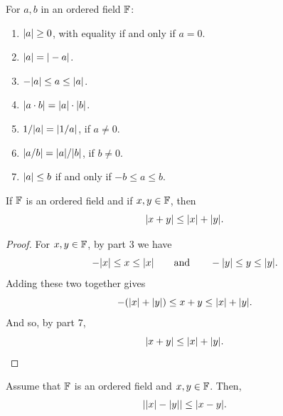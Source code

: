 \documentclass[11pt,twoside=off,numbers=noenddot]{scrbook}
\begin{document}
\begin{fact}
    For $a, b$ in an ordered field $\mathbb F$:
    \begin{enumerate}
        \item $| a | \geq 0$, with equality if and only if $a = 0$.
        \item $| a | = | -a |$.
        \item $-| a | \leq a \leq | a |$.
        \item $| a \cdot b | = | a | \cdot | b |$.
        \item $1/| a | = | 1/a |$, if $a \neq 0$.
        \item $| a/b | = | a |/| b |$, if $b \neq 0$.
        \item $| a | \leq b$ if and only if $-b \leq a \leq b$.
    \end{enumerate}
\end{fact}

\begin{theorem}
    If $\mathbb F$ is an ordered field and if $x, y \in \mathbb F$, then
    \[ | x + y | \leq | x | + | y |. \]
\end{theorem}

\begin{proof}
    For $x, y \in \mathbb F$, by  part 3 we have
    \[ -| x | \leq x \leq | x | \qquad \text{and} \qquad -| y | \leq y \leq | y |. \]
    Adding these two together gives
    \[ -(| x | + | y |) \leq x + y \leq | x | + | y |. \]
    And so, by  part 7,
    \[ | x + y | \leq | x | + | y |. \]
\end{proof}

\begin{corollary}
    Assume that $\mathbb F$ is an ordered field and $x, y \in \mathbb F$. Then,
    \begin{align*}
        | | x | - | y | | \leq | x - y |.
    \end{align*}
\end{corollary}
\end{document}
